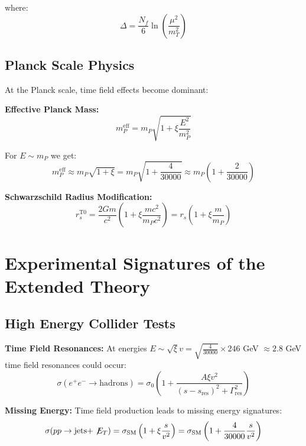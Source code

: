 \documentclass[12pt,a4paper]{report}
\newcommand{\xipar}{\xi}      %
\begin{document}
	where:
	\begin{equation}
		\Delta = \frac{N_f}{6} \ln\left(\frac{\mu^2}{m_T^2}\right)
	\end{equation}
	
	\subsection{Planck Scale Physics}\label{subsec:planck_scale_physics}
	
	At the Planck scale, time field effects become dominant:
	
	\textbf{Effective Planck Mass:}
	\begin{equation}
		m_P^{\text{eff}} = m_P \sqrt{1 + \xipar \frac{E^2}{m_P^2}}
	\end{equation}
	
	For $E \sim m_P$ we get:
	\begin{equation}
		m_P^{\text{eff}} \approx m_P \sqrt{1 + \xipar} = m_P \sqrt{1 + \frac{4}{30000}} \approx m_P \left(1 + \frac{2}{30000}\right)
	\end{equation}
	
	\textbf{Schwarzschild Radius Modification:}
	\begin{equation}
		r_s^{\text{T0}} = \frac{2Gm}{c^2} \left(1 + \xipar \frac{mc^2}{m_P c^2}\right) = r_s \left(1 + \xipar \frac{m}{m_P}\right)
	\end{equation}
	
	\section{Experimental Signatures of the Extended Theory}\label{sec:experimental_signatures_extended}
	
	\subsection{High Energy Collider Tests}\label{subsec:high_energy_collider_tests}
	
	\textbf{Time Field Resonances:}
	At energies $E \sim \sqrt{\xipar} v = \sqrt{\frac{4}{30000}} \times 246$ GeV $\approx 2.8$ GeV time field resonances could occur:
	\begin{equation}
		\sigma(e^+ e^- \to \text{hadrons}) = \sigma_0 \left(1 + \frac{A \xipar v^2}{(s - s_{\text{res}})^2 + \Gamma_{\text{res}}^2}\right)
	\end{equation}
	
	\textbf{Missing Energy:}
	Time field production leads to missing energy signatures:
	\begin{equation}
		\sigma(pp \to \text{jets} + \not\!E_T) = \sigma_{\text{SM}} \left(1 + \xipar \frac{s}{v^2}\right) = \sigma_{\text{SM}} \left(1 + \frac{4}{30000} \frac{s}{v^2}\right)
	\end{equation}
	
\end{document}
